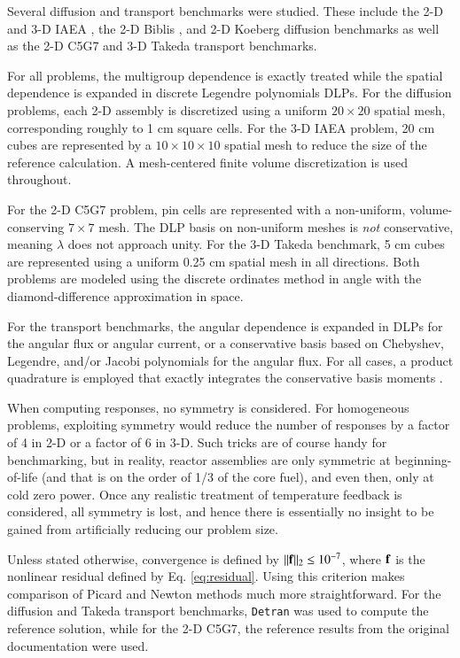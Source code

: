 Several diffusion and transport benchmarks were studied.  These 
include  the 2-D and 3-D IAEA \cite{argonne}, the 2-D 
Biblis \cite{muller}, and 2-D Koeberg diffusion benchmarks as well 
as the 2-D C5G7 \cite{c5g7} 
and 3-D Takeda \cite{takeda} transport benchmarks.

For all problems, the multigroup dependence is exactly treated while the 
spatial dependence is expanded in discrete Legendre polynomials 
\cite{mosher2006ifr, robertsphd} DLPs.  For the diffusion 
problems, each 2-D assembly is discretized 
using a uniform $20\times 20$ spatial mesh, corresponding roughly to 
1 cm square cells.  For the 3-D IAEA problem, 20 cm cubes are 
represented by a $10 \times 10 \times 10$ spatial mesh to reduce 
the size of the reference calculation.   A mesh-centered finite 
volume discretization is used throughout.

For the 2-D C5G7 problem, pin cells are represented with 
a non-uniform, volume-conserving $7\times 7$ 
mesh.   The DLP basis on non-uniform meshes is {\it not} 
conservative, meaning $\lambda$ does not approach unity.
For the 3-D Takeda benchmark, 5 cm 
cubes are represented using a uniform 0.25 cm spatial mesh in 
all directions.  Both problems are modeled using the discrete ordinates 
method in angle with the diamond-difference
approximation in space.

For the transport benchmarks, the angular dependence is expanded 
in DLPs for the angular flux or 
angular current, or a conservative basis based on Chebyshev, Legendre, 
and/or Jacobi polynomials \cite{robertsphd, zhang2012ehs} 
for the angular flux.  For all cases, a product quadrature is employed 
that exactly integrates the conservative basis moments \cite{robertsphd}.

When computing responses, no symmetry is considered.  For homogeneous
problems, exploiting symmetry would reduce the number of responses 
by a factor of 4 in 2-D or a factor of 6 in 3-D.  Such tricks are 
of course handy for benchmarking, but in reality, reactor assemblies 
are only symmetric at beginning-of-life (and that is on the order 
of 1/3 of the core fuel), and even then, only at cold zero power.  Once
any realistic treatment of temperature feedback is considered, all 
symmetry is lost, and hence there is essentially no insight to be gained 
from artificially reducing our problem size.

Unless stated otherwise, 
convergence is defined by $||\mathbf{f}||_2 \leq 10^{-7}$, where
$\mathbf{f}$ is the nonlinear residual defined by Eq. \ref{eq:residual}.
Using this criterion makes comparison of Picard and Newton methods much 
more straightforward.   For the diffusion and Takeda transport 
benchmarks, {\tt Detran} was used to compute the reference solution, 
while for the 2-D C5G7, the reference results from the original 
documentation were used.

